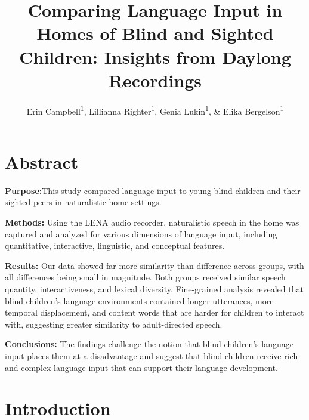 \documentclass[
  man,floatsintext]{apa6}
\title{Comparing Language Input in Homes of Blind and Sighted Children: Insights from Daylong Recordings}
\author{Erin Campbell\textsuperscript{1}, Lillianna Righter\textsuperscript{1}, Genia Lukin\textsuperscript{1}, \& Elika Bergelson\textsuperscript{1}}
\date{}
\affiliation{\vspace{0.5cm}\textsuperscript{1} Department of Psychology \& Neuroscience, Duke University, Durham, NC}
\begin{document}
\maketitle

\hypertarget{abstract}{%
\section{Abstract}\label{abstract}}

\textbf{Purpose:}This study compared language input to young blind children and their sighted peers in naturalistic home settings.

\textbf{Methods:} Using the LENA audio recorder, naturalistic speech in the home was captured and analyzed for various dimensions of language input, including quantitative, interactive, linguistic, and conceptual features.

\textbf{Results:} Our data showed far more similarity than difference across groups, with all differences being small in magnitude. Both groups received similar speech quantity, interactiveness, and lexical diversity. Fine-grained analysis revealed that blind children's language environments contained longer utterances, more temporal displacement, and content words that are harder for children to interact with, suggesting greater similarity to adult-directed speech.

\textbf{Conclusions:} The findings challenge the notion that blind children's language input places them at a disadvantage and suggest that blind children receive rich and complex language input that can support their language development.

\hypertarget{introduction}{%
\section{Introduction}\label{introduction}}
\end{document}
